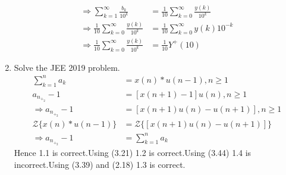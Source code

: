 \documentclass[journal,12pt,twocolumn]{IEEEtran}
\renewcommand\thesection{\arabic{section}}
\begin{document}
\begin{enumerate}[label=\thesection.\arabic*,ref=\thesection.\theenumi]
\begin{align}
	\Rightarrow \sum_{k=1}^{\infty}\frac{b_k}{10^{k}}&=\frac{1}{10}\sum_{k=0}^{\infty}\frac{y(k)}{10^{k}}\\
	\Rightarrow \frac{1}{10}\sum_{k=0}^{\infty}\frac{y(k)}{10^{k}}&=\frac{1}{10}\sum_{k=0}^{\infty}y(k)10^{-k}\\
	\Rightarrow \frac{1}{10}\sum_{k=0}^{\infty}\frac{y(k)}{10^{k}}&=\frac{1}{10}Y^{+}(10)
\end{align}
\item Solve the JEE 2019 problem.
\solution
\begin{align}
	\sum_{k=1}^{n}a_k&=x(n)*u(n-1),n \ge 1\\
	a_n_+_2-1&=[x(n+1)-1]u(n),n \ge 1\\
	\Rightarrow a_n_+_2-1&=[x(n+1)u(n)-u(n+1)],n \ge 1\\
	{\mathcal {Z}}\{x(n)*u(n-1)\}&={\mathcal {Z}}\{[x(n+1)u(n)-u(n+1)]\}\\
	\Rightarrow a_n_+_2-1&=\sum_{k=1}^{n}a_k
\end{align}
Hence 1.1 is correct.Using (3.21) 1.2 is correct.Using (3.44) 1.4 is incorrect.Using (3.39) and (2.18) 1.3 is correct.
\end{enumerate}
\end{document}
